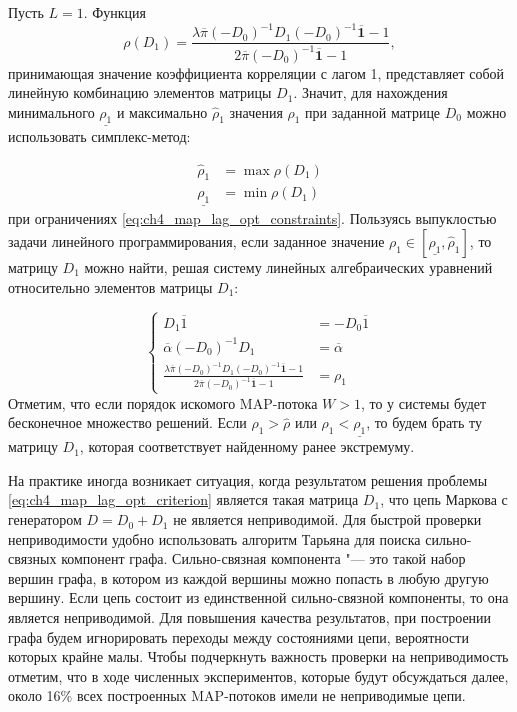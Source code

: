 Пусть $L = 1$. Функция
$$
\rho(D_1) = \frac{\lambda \overline{\pi} (-D_0)^{-1} D_1 (-D_0)^{-1} \overline{\mathbf{1}} - 1}{2 \overline{\pi} (-D_0)^{-1} \overline{\mathbf{1}} - 1},
$$
принимающая значение коэффициента корреляции с лагом 1, представляет собой линейную комбинацию элементов матрицы $D_1$. Значит, для нахождения минимального $\underline{\rho_1}$ и максимально $\hat{\rho}_1$ значения $\rho_1$ при заданной матрице $D_0$ можно использовать симплекс-метод:

\begin{equation}
    \label{eq:ch4_approx_map_rho_boundaries}
    \begin{aligned}
        \hat{\rho}_1 &= \max \rho(D_1)\\
        \underline{\rho_1} &= \min \rho(D_1)
    \end{aligned}
\end{equation}
при ограничениях \eqref{eq:ch4_map_lag_opt_constraints}. Пользуясь выпуклостью задачи линейного программирования, если заданное значение $\rho_1 \in [\underline{\rho_1}, \hat{\rho}_1]$, то матрицу $D_1$ можно найти, решая систему линейных алгебраических уравнений относительно элементов матрицы $D_1$:

\begin{equation}
    \label{eq:ch4_map_lag_opt_ales}
    \begin{cases}
        D_1 \overline{1} &= -D_0 \overline{1}\\
        \overline{\alpha} (-D_0)^{-1} D_1 &= \overline{\alpha}\\
        \frac{\lambda \overline{\pi} (-D_0)^{-1} D_1 (-D_0)^{-1} \overline{\mathbf{1}} - 1}{2 \overline{\pi} (-D_0)^{-1} \overline{\mathbf{1}} - 1} &= \rho_1
    \end{cases}
\end{equation}
Отметим, что если порядок искомого MAP-потока $W > 1$, то у системы будет бесконечное множество решений. Если $\rho_1 > \hat{\rho}$ или $\rho_1 < \underline{\rho_1}$, то будем брать ту матрицу $D_1$, которая соответствует найденному ранее экстремуму.

На практике иногда возникает ситуация, когда результатом решения проблемы \eqref{eq:ch4_map_lag_opt_criterion} является такая матрица $D_1$, что цепь Маркова с генератором $D = D_0 + D_1$ не является неприводимой. Для быстрой проверки неприводимости удобно использовать алгоритм Тарьяна \cite{tarjan72} для поиска сильно-связных компонент графа. Сильно-связная компонента "--- это такой набор вершин графа, в котором из каждой вершины можно попасть в любую другую вершину. Если цепь состоит из единственной сильно-связной компоненты, то она является неприводимой. Для повышения качества результатов, при построении графа будем игнорировать переходы между состояниями цепи, вероятности которых крайне малы. Чтобы подчеркнуть важность проверки на неприводимость отметим, что в ходе численных экспериментов, которые будут обсуждаться далее, около 16\% всех построенных MAP-потоков имели не неприводимые цепи.


